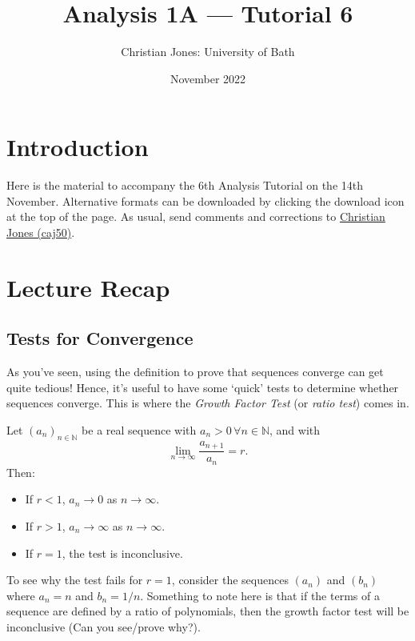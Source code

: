 \documentclass[
  12pt,
  a4paper]{extarticle}
\title{Analysis 1A --- Tutorial 6}
\author{Christian Jones: University of Bath}
\date{November 2022}
\providecommand{\tightlist}{%
  \setlength{\itemsep}{0pt}\setlength{\parskip}{0pt}}
\theoremstyle{plain}
\theoremstyle{plain}
\theoremstyle{plain}
\theoremstyle{plain}
\theoremstyle{plain}
\theoremstyle{definition}
\theoremstyle{definition}
\theoremstyle{definition}
\theoremstyle{remark}
\let\BeginKnitrBlock\begin \let\EndKnitrBlock\end
\renewcommand{\;}{\,}
\begin{document}
\maketitle

{
\setcounter{tocdepth}{2}
\tableofcontents
}
\newpage
{}

\hypertarget{introduction}{%
\section*{Introduction}\label{introduction}}

Here is the material to accompany the 6th Analysis Tutorial on the 14th November. Alternative formats can be downloaded by clicking the download icon at the top of the page. As usual, send comments and corrections to \href{mailto:caj50@bath.ac.uk}{Christian Jones (caj50)}.

\hypertarget{lecture-recap}{%
\section{Lecture Recap}\label{lecture-recap}}

\hypertarget{tests-for-convergence}{%
\subsection{Tests for Convergence}\label{tests-for-convergence}}

As you've seen, using the definition to prove that sequences converge can get quite tedious! Hence, it's useful to have some `quick' tests to determine whether sequences converge. This is where the \emph{Growth Factor Test} (or \emph{ratio test}) comes in.

\BeginKnitrBlock{theorem}[Growth Factor Test]
{\label{thm:thm1} }Let \((a_n)_{n\in\mathbb{N}}\) be a real sequence with \(a_n>0 \; \forall n\in\mathbb{N}\), and with \[\lim_{n\to\infty} \frac{a_{n+1}}{a_n} = r.\] Then:

\begin{itemize}
\tightlist
\item
  If \(r < 1\), \(a_n \to 0\) as \(n \to \infty\).
\item
  If \(r > 1\), \(a_n \to \infty\) as \(n \to \infty\).
\item
  If \(r = 1\), the test is inconclusive.
\end{itemize}
\EndKnitrBlock{theorem}

To see why the test fails for \(r = 1\), consider the sequences \((a_n)\) and \((b_n)\) where \(a_n = n\) and \(b_n = 1/n\). Something to note here is that if the terms of a sequence are defined by a ratio of polynomials, then the growth factor test will be inconclusive (Can you see/prove why?).
\end{document}
